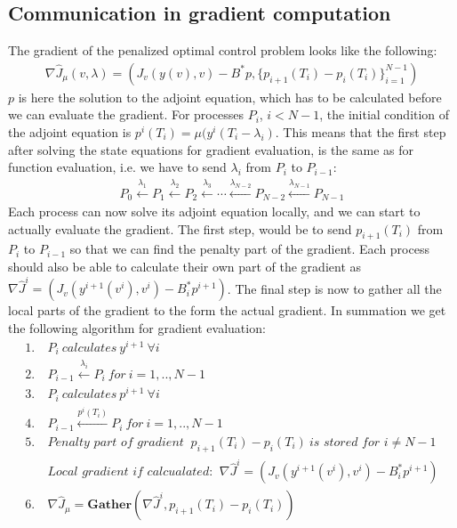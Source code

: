 \subsection{Communication in gradient computation}
The gradient of the penalized optimal control problem looks like the following:
\begin{align*}
\nabla \hat J_{\mu}(v,\lambda) = (J_v(y(v),v)-B^*p,\{p_{i+1}(T_i) - p_{i}(T_i)\}_{i=1}^{N-1})
\end{align*}
$p$ is here the solution to the adjoint equation, which has to be calculated before we can evaluate the gradient. For processes $P_i$, $i<N-1$, the initial condition of the adjoint equation is $p^i(T_{i})=\mu(y^i(T_{i}-\lambda_{i})$. This means that the first step after solving the state equations for gradient evaluation, is the same as for function evaluation, i.e. we have to send $\lambda_i$ from $P_{i}$ to $P_{i-1}$:
\begin{align*}
P_0\overset{\lambda_1}{\longleftarrow}P_1\overset{\lambda_2}{\longleftarrow}P_2 \overset{\lambda_3}{\longleftarrow}\cdots \overset{\lambda_{N-2}}{\longleftarrow}P_{N-2}\overset{\lambda_{N-1}}{\longleftarrow}P_{N-1}
\end{align*}
Each process can now solve its adjoint equation locally, and we can start to actually evaluate the gradient. The first step, would be to send $p_{i+1}(T_{i})$ from $P_i$ to $P_{i-1}$ so that we can find the penalty part of the gradient. Each process should also be able to calculate their own part of the gradient as $\nabla \hat J^i=(J_v(y^{i+1}(v^i),v^i)-B^*_ip^{i+1})$. The final step is now to gather all the local parts of the gradient to the form the actual gradient. In summation we get the following algorithm for gradient evaluation:
\begin{align*}
1. \ &P_i \ \textit{calculates} \ y^{i+1} \ \forall i \\
2. \ &P_{i-1}\overset{\lambda_i}{\longleftarrow}P_{i} \ \textit{for} \ i=1,..,N-1 \\
3. \ &P_i \ \textit{calculates} \ p^{i+1} \ \forall i \\
4. \ &P_{i-1}\overset{p^i(T_i)}{\longleftarrow}P_{i} \ \textit{for} \ i=1,..,N-1 \\
5. \ &\textit{Penalty part of gradient } \ p_{i+1}(T_i) - p_{i}(T_i) \ \textit{is stored for $i\neq N-1$} \\
&\textit{Local gradient if calcualated: } \ \nabla \hat J^i=(J_v(y^{i+1}(v^i),v^i)-B^*_ip^{i+1}) \\
6. \ &\nabla \hat J_{\mu} = \textbf{Gather}(\nabla \hat J^i,p_{i+1}(T_i) - p_{i}(T_i))
\end{align*}
